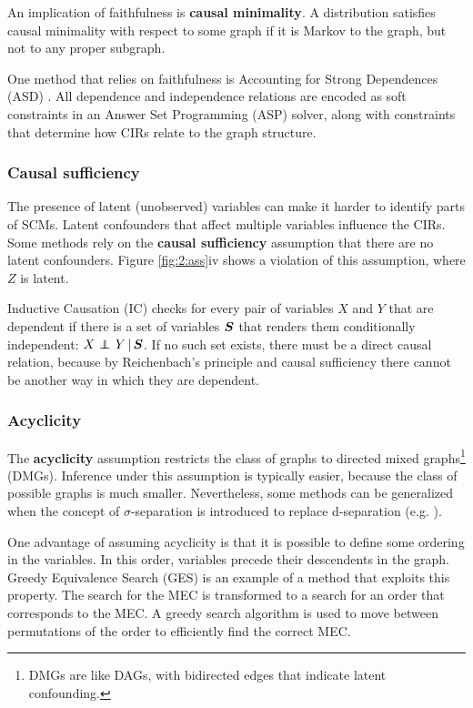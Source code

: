 An implication of faithfulness is \textbf{causal minimality}. A distribution satisfies causal minimality with respect to some graph if it is Markov to the graph, but not to any proper subgraph. 

One method that relies on faithfulness is Accounting for Strong Dependences (ASD) \citep{hyttinen2014constraint}. All dependence and independence relations are encoded as soft constraints in an Answer Set Programming (ASP) solver, along with constraints that determine how CIRs relate to the graph structure.

\subsubsection{Causal sufficiency}

The presence of latent (unobserved) variables can make it harder to identify parts of SCMs. Latent confounders that affect multiple variables influence the CIRs. Some methods rely on the \textbf{causal sufficiency} assumption that there are no latent confounders. Figure \ref{fig:2:ass}iv shows a violation of this assumption, where $Z$ is latent.

Inductive Causation (IC) \citep{verma1991equivalence} checks for every pair of variables $X$ and $Y$ that are dependent if there is a set of variables $\bm{S}$ that renders them conditionally independent: ${X} \operatorname*{{\,\perp\mkern-12mu\perp\,}}_{} {Y} \,|\, {\bm{S}}$. If no such set exists, there must be a direct causal relation, because by Reichenbach's principle and causal sufficiency there cannot be another way in which they are dependent.

\subsubsection{Acyclicity}

The \textbf{acyclicity} assumption restricts the class of graphs to directed mixed graphs\footnote{DMGs are like DAGs, with bidirected edges that indicate latent confounding.} (DMGs). Inference under this assumption is typically easier, because the class of possible graphs is much smaller. Nevertheless, some methods can be generalized when the concept of $\sigma$-separation is introduced to replace d-separation (e.g. \citet{mooij2016joint}). 

One advantage of assuming acyclicity is that it is possible to define some ordering in the variables. In this order, variables precede their descendents in the graph. Greedy Equivalence Search (GES) \citep{chickering2002optimal} is an example of a method that exploits this property. The search for the MEC is transformed to a search for an order that corresponds to the MEC. A greedy search algorithm is used to move between permutations of the order to efficiently find the correct MEC. 

